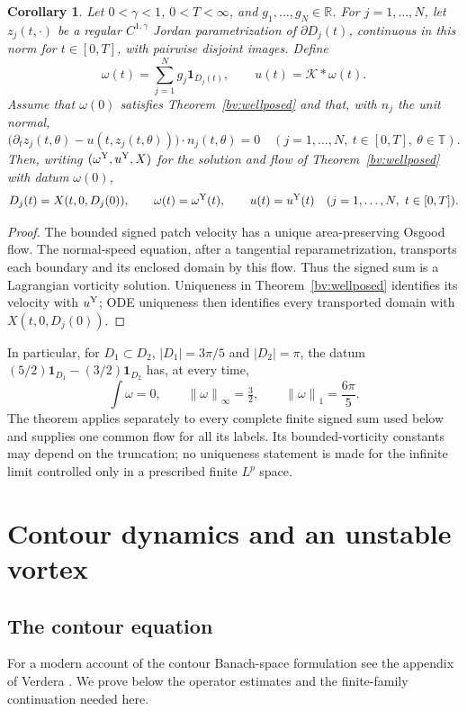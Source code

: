 \documentclass[11pt]{amsart}
\newtheorem{corollary}[theorem]{Corollary}
\theoremstyle{remark}
\numberwithin{equation}{section}
\newcommand{\norm}[1]{\left\lVert#1\right\rVert}
\newcommand{\R}{\mathbb R}
\newcommand{\T}{\mathbb T}
\begin{document}
\begin{corollary}
\label{bv:contouridentification}
Let $0<\gamma<1$, $0<T<\infty$, and $g_1,\ldots,g_N\in\R$.
For $j=1,\ldots,N$, let $z_j(t,\cdot)$ be a regular
$C^{1,\gamma}$ Jordan parametrization of $\partial D_j(t)$,
continuous in this norm for $t\in[0,T]$, with pairwise disjoint
images. Define
\[
 \omega(t)=\sum_{j=1}^Ng_j\mathbf1_{D_j(t)},\qquad
 u(t)=\mathcal K*\omega(t).
\]
Assume that $\omega(0)$ satisfies Theorem~\ref{bv:wellposed} and
that, with $n_j$ the unit normal,
\[
 \bigl(\partial_tz_j(t,\theta)-u(t,z_j(t,\theta))\bigr)
       \cdot n_j(t,\theta)=0
 \quad(j=1,\ldots,N,\ t\in[0,T],\ \theta\in\T).
\]
Then, writing $(\omega^{\rm Y},u^{\rm Y},X)$ for the solution and
flow of Theorem~\ref{bv:wellposed} with datum $\omega(0)$,
\[
 D_j(t)=X(t,0,D_j(0)),\qquad
 \omega(t)=\omega^{\rm Y}(t),\qquad u(t)=u^{\rm Y}(t)
 \quad(j=1,\ldots,N,\ t\in[0,T]).
\]
\end{corollary}
\begin{proof}
The bounded signed patch velocity has a unique area-preserving
Osgood flow. The normal-speed equation, after a tangential
reparametrization, transports each boundary and its enclosed
domain by this flow. Thus the signed sum is a Lagrangian
vorticity solution. Uniqueness in Theorem~\ref{bv:wellposed}
identifies its velocity with $u^{\rm Y}$; ODE uniqueness then
identifies every transported domain with $X(t,0,D_j(0))$.
\end{proof}

In particular, for $D_1\subset D_2$, $|D_1|=3\pi/5$ and
$|D_2|=\pi$, the datum
$(5/2)\mathbf1_{D_1}-(3/2)\mathbf1_{D_2}$ has, at every time,
\[
 \int\omega=0,\qquad \norm\omega_\infty=\tfrac32,\qquad
 \norm\omega_1=\frac{6\pi}{5}.
\]
The theorem applies separately to every complete finite signed
sum used below and supplies one common flow for all its labels.
Its bounded-vorticity constants may depend on the truncation;
no uniqueness statement is made for the infinite limit
controlled only in a prescribed finite $L^p$ space.


\section{Contour dynamics and an unstable vortex}\label{part:pc}
\subsection{The contour equation}
For a modern account of the contour Banach-space formulation see the appendix of Verdera \cite{Verdera}. We prove below the operator estimates and the finite-family continuation needed here.
\end{document}
